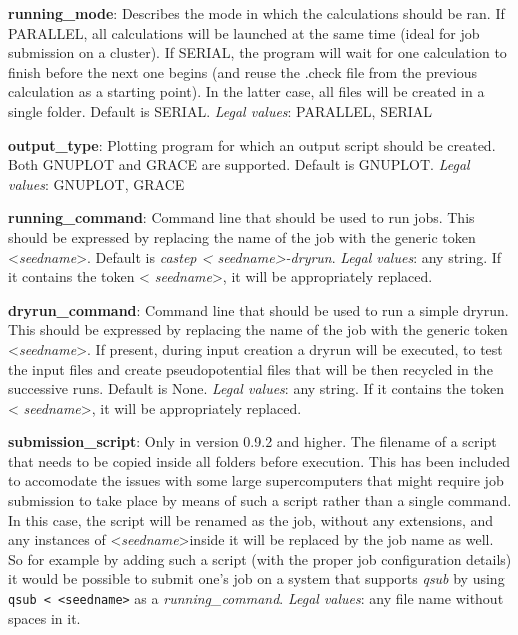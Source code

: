 \documentclass[10pt]{article}
\begin{document}
\textbf{running\_mode}: Describes the mode in which the calculations should be 
ran. If PARALLEL, all calculations will be launched at the same time (ideal for 
job submission on a cluster). If SERIAL, the program will wait for one 
calculation to finish before the next one begins (and reuse the .check file from 
the previous calculation as a starting point). In the latter case, all files 
will be created in a single folder. Default is SERIAL.\newline
\textit{Legal values}: PARALLEL, SERIAL\newline

\textbf{output\_type}: Plotting program for which an output script should be 
created. Both GNUPLOT and GRACE are supported. Default is GNUPLOT.\newline
\textit{Legal values}: GNUPLOT, GRACE\newline

\textbf{running\_command}: Command line that should be used to run jobs. This 
should be expressed by replacing the name of the job with the generic token 
\textless \textit{seedname}\textgreater. Default is \textit{castep \textless 
seedname\textgreater -dryrun}.\newline
\textit{Legal values}: any string. If it contains the token \textless 
\textit{seedname}\textgreater, it will be appropriately replaced.\newline

\textbf{dryrun\_command}: Command line that should be used to run a simple dryrun. This 
should be expressed by replacing the name of the job with the generic token 
\textless \textit{seedname}\textgreater. If present, during input creation a dryrun will be executed,
to test the input files and create pseudopotential files that will be then recycled in the successive runs.
Default is None.\newline
\textit{Legal values}: any string. If it contains the token \textless 
\textit{seedname}\textgreater, it will be appropriately replaced.\newline

\textbf{submission\_script}: Only in version 0.9.2 and higher. The filename of a 
script that needs to be copied inside all folders before execution. This has 
been included to accomodate the issues with some large supercomputers that might 
require job submission to take place by means of such a script rather than a 
single command. In this case, the script will be renamed as the job, without any 
extensions, and any instances of \textless \textit{seedname}\textgreater inside 
it will be replaced by the job name as well. So for example by adding such a 
script (with the proper job configuration details) it would be possible to 
submit one's job on a system that supports \textit{qsub} by using \texttt{qsub 
\textless~\textless seedname\textgreater} as a 
\textit{running\_command}.\newline
\textit{Legal values}: any file name without spaces in it.
\end{document}

